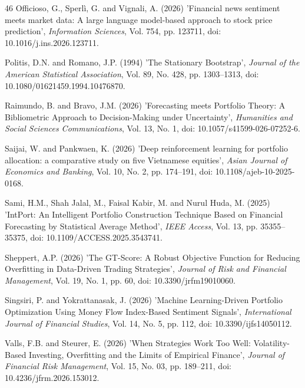 \documentclass{singlecol-new}
\theoremstyle{TH}{
\newtheorem{lemma}{Lemma}
\newtheorem{theorem}[lemma]{Theorem}
\newtheorem{corrolary}[lemma]{Corrolary}
\newtheorem{conjecture}[lemma]{Conjecture}
\newtheorem{proposition}[lemma]{Proposition}
\newtheorem{claim}[lemma]{Claim}
\newtheorem{stheorem}[lemma]{Wrong Theorem}
\newtheorem{algorithm}{Algorithm}
}
\theoremstyle{THrm}{
\newtheorem{definition}{Definition}[section]
\newtheorem{question}{Question}[section]
\newtheorem{remark}{Remark}
\newtheorem{scheme}{Scheme}
}
\theoremstyle{THhit}{
\newtheorem{case}{Case}[section]
}
\begin{document}
\begin{thebibliography}{46}
Officioso, G., Sperlì, G. and Vignali, A. (2026) 'Financial news sentiment meets market data: A large language model-based approach to stock price prediction', {\it Information Sciences}, Vol. 754, pp. 123711, doi: 10.1016/j.ins.2026.123711.

Politis, D.N. and Romano, J.P. (1994) 'The Stationary Bootstrap', {\it Journal of the American Statistical Association}, Vol. 89, No. 428, pp. 1303--1313, doi: 10.1080/01621459.1994.10476870.

Raimundo, B. and Bravo, J.M. (2026) 'Forecasting meets Portfolio Theory: A Bibliometric Approach to Decision-Making under Uncertainty', {\it Humanities and Social Sciences Communications}, Vol. 13, No. 1, doi: 10.1057/s41599-026-07252-6.

Saijai, W. and Pankwaen, K. (2026) 'Deep reinforcement learning for portfolio allocation: a comparative study on five Vietnamese equities', {\it Asian Journal of Economics and Banking}, Vol. 10, No. 2, pp. 174--191, doi: 10.1108/ajeb-10-2025-0168.

Sami, H.M., Shah Jalal, M., Faisal Kabir, M. and Nurul Huda, M. (2025) 'IntPort: An Intelligent Portfolio Construction Technique Based on Financial Forecasting by Statistical Average Method', {\it IEEE Access}, Vol. 13, pp. 35355--35375, doi: 10.1109/ACCESS.2025.3543741.

Sheppert, A.P. (2026) 'The GT-Score: A Robust Objective Function for Reducing Overfitting in Data-Driven Trading Strategies', {\it Journal of Risk and Financial Management}, Vol. 19, No. 1, pp. 60, doi: 10.3390/jrfm19010060.

Singsiri, P. and Yokrattanasak, J. (2026) 'Machine Learning-Driven Portfolio Optimization Using Money Flow Index-Based Sentiment Signals', {\it International Journal of Financial Studies}, Vol. 14, No. 5, pp. 112, doi: 10.3390/ijfs14050112.

Valls, F.B. and Steurer, E. (2026) 'When Strategies Work Too Well: Volatility-Based Investing, Overfitting and the Limits of Empirical Finance', {\it Journal of Financial Risk Management}, Vol. 15, No. 03, pp. 189--211, doi: 10.4236/jfrm.2026.153012.


\end{thebibliography}
\end{document}
